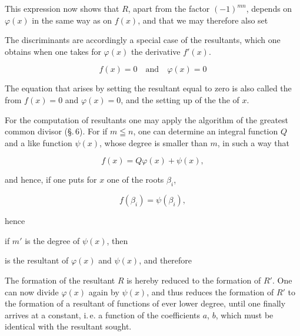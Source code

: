 
This expression now shows that $R$, apart from the factor
$(-1)^{mn}$, depends on $\varphi(x)$ in the same way as
on $f(x)$, and that we may therefore also set


The discriminants are accordingly a special case of the
resultants, which one obtains when one takes for $\varphi(x)$ the derivative
$f'(x)$.


\[ f(x) = 0 \quad \text{and} \quad \varphi(x) = 0 \]


The equation that arises by setting the resultant equal to zero
is also called the  from $f(x) = 0$ and $\varphi(x) = 0$,
and the setting up of the  the 
of $x$.

For the computation of resultants one may apply the algorithm
of the greatest common divisor (\S.\,6). For if
$m \leqq n$, one can determine an integral function $Q$ and a like
 function $\psi(x)$, whose degree is smaller than $m$, in such a way
 that

\[ f(x) = Q\varphi(x) + \psi(x), \]

and hence, if one puts for $x$ one of the roots $\beta_i$,

\[ f(\beta_i) = \psi(\beta_i), \]

hence


if $m'$ is the degree of $\psi(x)$, then


is the resultant of $\varphi(x)$ and $\psi(x)$, and therefore


The formation of the resultant $R$ is hereby reduced to the formation
of $R'$. One can now divide $\varphi(x)$ again by $\psi(x)$,
and thus reduces the formation of $R'$ to the formation of a
resultant of functions of ever lower degree, until
one finally arrives at a constant, i.\,e. a function of the
coefficients $a$, $b$, which must be identical with the resultant
 sought.
